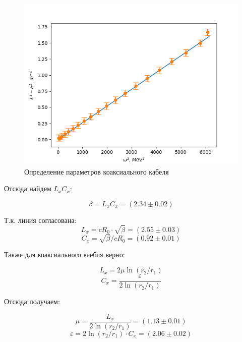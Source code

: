 \documentclass[a4paper]{article}
\begin{document}
\begin{figure}[h!]
    \centering
    \includegraphics[width=0.6\pdfpagewidth]{graph1.png}
    \caption{Определение параметров коаксиального кабеля}
\end{figure}

Отсюда найдем $L_xC_x$:

\begin{equation}
    \beta = L_xC_x = (2.34 \pm 0.02)
\end{equation}

Т.к. линия согласована:
\begin{equation}
    L_x = cR_0 \cdot \sqrt{\beta} = (2.55 \pm 0.03)
\end{equation}
\begin{equation}
    C_x = \sqrt{\beta} / cR_0 = (0.92 \pm 0.01)
\end{equation}

Также для коаксиального каебля верно:

\begin{equation}
    L_x = 2 \mu \ln(r_2/r_1)
\end{equation}
\begin{equation}
    C_x = \frac{\varepsilon}{2 \ln(r_2/r_1)}
\end{equation}

Отсюда получаем:

\begin{equation}
    \mu = \frac{L_x}{2 \ln(r_2/r_1)} = (1.13 \pm 0.01)
\end{equation}
\begin{equation}
    \varepsilon = 2 \ln(r_2/r_1) \cdot C_x = (2.06 \pm 0.02)
\end{equation}
\end{document}
